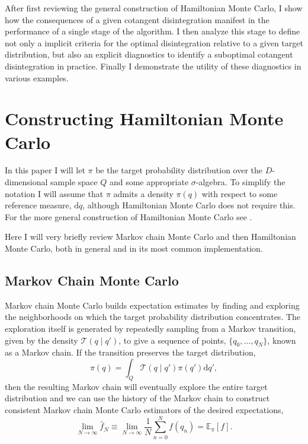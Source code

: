 \documentclass[stslayout]{imsart}
\newcommand\dd{\mathrm{d}}
\begin{document}
After first reviewing the general construction of Hamiltonian Monte Carlo, I
show how the consequences of a given cotangent disintegration manifest
in the performance of a single stage of the algorithm.  I then analyze this 
stage to define not only a implicit criteria for the optimal disintegration 
relative to a given target distribution, but also an explicit diagnostics to 
identify a suboptimal cotangent disintegration in practice.  Finally I
demonstrate the utility of these diagnostics in various examples.

\section{Constructing Hamiltonian Monte Carlo}

In this paper I will let $\pi$ be the target probability distribution over the 
$D$-dimensional sample space $Q$ and some appropriate $\sigma$-algebra.  
To simplify the notation I will assume that $\pi$ admits a density 
$\pi \! \left( q \right)$ with respect to some reference measure, $\dd q$, 
although Hamiltonian Monte Carlo does not require this.  For the more 
general construction of Hamiltonian Monte Carlo see 
\cite{BetancourtEtAl:2014a}.

Here I will very briefly review Markov chain Monte Carlo and then
Hamiltonian Monte Carlo, both in general and in its most common
implementation.

\subsection{Markov Chain Monte Carlo}

Markov chain Monte Carlo builds expectation estimates by finding and
exploring the neighborhoods on which the target probability distribution
concentrates.  The exploration itself is generated by repeatedly sampling 
from a Markov transition, given by the density 
$\mathcal{T} \! \left( q \mid q' \right)$, to give a sequence of points, 
$\{ q_{0}, \ldots, q_{N} \}$, known as a Markov chain.  If the transition 
preserves the target distribution,
%
\begin{equation*}
\pi \! \left( q \right) = 
\int_{Q} \mathcal{T} \! \left( q \mid q' \right) \pi \! \left( q' \right) \dd q',
\end{equation*}
%
then the resulting Markov chain will eventually explore the entire target 
distribution and we can use the history of the Markov chain to construct
consistent Markov chain Monte Carlo estimators of the desired
expectations,
%
\begin{equation*}
\lim_{N \rightarrow \infty} \hat{f}_{N}
\equiv
\lim_{N \rightarrow \infty} \frac{1}{N} \sum_{n = 0}^{N} f \! \left( q_{n} \right)
= \mathbb{E}_{\pi} \! \left[ f \right].
\end{equation*}
\end{document}
